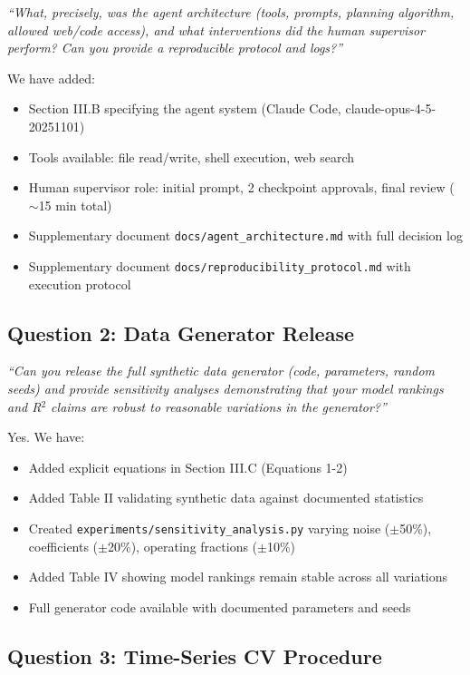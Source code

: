 \documentclass[11pt]{article}
\newcommand{\reviewer}[1]{\textcolor{reviewercolor}{\textit{#1}}}
\newcommand{\response}[1]{\textcolor{responsecolor}{#1}}
\begin{document}
\reviewer{``What, precisely, was the agent architecture (tools, prompts, planning algorithm, allowed web/code access), and what interventions did the human supervisor perform? Can you provide a reproducible protocol and logs?''}

\response{We have added:
\begin{itemize}
    \item Section III.B specifying the agent system (Claude Code, claude-opus-4-5-20251101)
    \item Tools available: file read/write, shell execution, web search
    \item Human supervisor role: initial prompt, 2 checkpoint approvals, final review ($\sim$15 min total)
    \item Supplementary document \texttt{docs/agent\_architecture.md} with full decision log
    \item Supplementary document \texttt{docs/reproducibility\_protocol.md} with execution protocol
\end{itemize}
}

\subsection*{Question 2: Data Generator Release}

\reviewer{``Can you release the full synthetic data generator (code, parameters, random seeds) and provide sensitivity analyses demonstrating that your model rankings and R$^2$ claims are robust to reasonable variations in the generator?''}

\response{Yes. We have:
\begin{itemize}
    \item Added explicit equations in Section III.C (Equations 1-2)
    \item Added Table II validating synthetic data against documented statistics
    \item Created \texttt{experiments/sensitivity\_analysis.py} varying noise ($\pm$50\%), coefficients ($\pm$20\%), operating fractions ($\pm$10\%)
    \item Added Table IV showing model rankings remain stable across all variations
    \item Full generator code available with documented parameters and seeds
\end{itemize}
}

\subsection*{Question 3: Time-Series CV Procedure}
\end{document}
